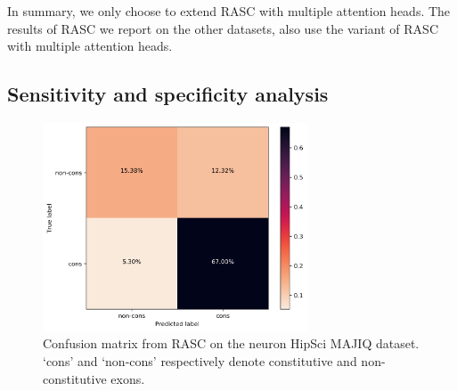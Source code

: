 In summary, we only choose to extend RASC with multiple attention heads. The results of RASC we report on the other datasets, also use the variant of RASC with multiple attention heads. 



\subsection{Sensitivity and specificity analysis}
\begin{figure}
	\centering\includegraphics[width=0.7\textwidth]{../visualizations/ch5-results/confusion_matrix.png} 
	\caption{Confusion matrix from RASC on the neuron HipSci MAJIQ dataset. `cons' and `non-cons' respectively denote constitutive and non-constitutive exons. }
	\label{fig:confusion_matrix}
\end{figure}

